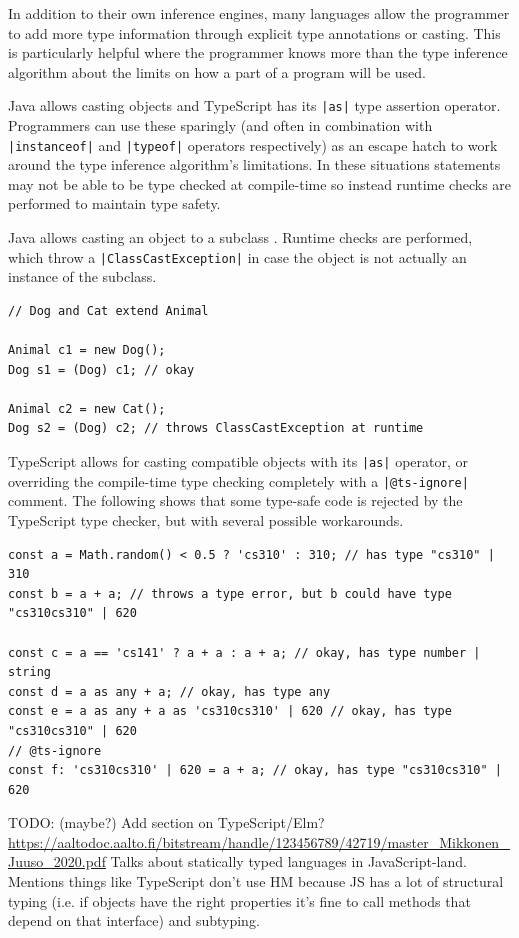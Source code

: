 \documentclass[a4paper,fleqn,twoside,12pt]{report}
\begin{document}
In addition to their own inference engines, many languages allow the programmer to add more type information through explicit type annotations or casting. This is particularly helpful where the programmer knows more than the type inference algorithm about the limits on how a part of a program will be used.

Java allows casting objects and TypeScript has its \texttt{|as|} type assertion operator. Programmers can use these sparingly (and often in combination with \texttt{|instanceof|} and \texttt{|typeof|} operators respectively) as an escape hatch to work around the type inference algorithm’s limitations. In these situations statements may not be able to be type checked at compile-time so instead runtime checks are performed to maintain type safety.

Java allows casting an object to a subclass \citep{ref25}. Runtime checks are performed, which throw a \texttt{|ClassCastException|} in case the object is not actually an instance of the subclass.

\begin{verbatim}
// Dog and Cat extend Animal

Animal c1 = new Dog();
Dog s1 = (Dog) c1; // okay

Animal c2 = new Cat();
Dog s2 = (Dog) c2; // throws ClassCastException at runtime
\end{verbatim}

TypeScript allows for casting compatible objects with its \texttt{|as|} operator, or overriding the compile-time type checking completely with a \texttt{|@ts-ignore|} comment. The following shows that some type-safe code is rejected by the TypeScript type checker, but with several possible workarounds.

\begin{verbatim}
const a = Math.random() < 0.5 ? 'cs310' : 310; // has type "cs310" | 310
const b = a + a; // throws a type error, but b could have type "cs310cs310" | 620

const c = a == 'cs141' ? a + a : a + a; // okay, has type number | string
const d = a as any + a; // okay, has type any
const e = a as any + a as 'cs310cs310' | 620 // okay, has type "cs310cs310" | 620
// @ts-ignore
const f: 'cs310cs310' | 620 = a + a; // okay, has type "cs310cs310" | 620
\end{verbatim}

TODO: (maybe?) Add section on TypeScript/Elm?
\underline{\href{https://aaltodoc.aalto.fi/bitstream/handle/123456789/42719/master\_Mikkonen\_Juuso\_2020.pdf}{https://aaltodoc.aalto.fi/bitstream/handle/123456789/42719/master\_Mikkonen\_Juuso\_2020.pdf}}
Talks about statically typed languages in JavaScript-land. Mentions things like TypeScript don’t use HM because JS has a lot of structural typing (i.e. if objects have the right properties it’s fine to call methods that depend on that interface) and subtyping.
\end{document}

